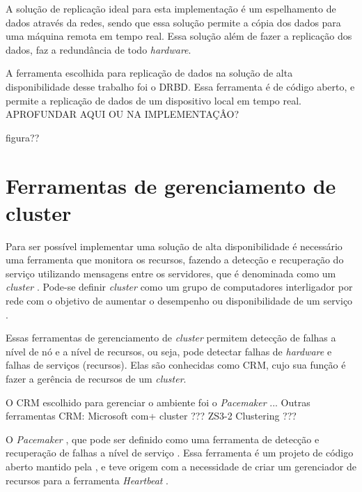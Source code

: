 A solução de replicação ideal para esta implementação é um espelhamento de dados através da redes, sendo que essa solução permite a cópia dos 
dados para uma máquina remota em tempo real. Essa solução além de fazer a replicação dos dados, faz a redundância de todo \textit{hardware}.

A ferramenta escolhida para replicação de dados na solução de alta disponibilidade desse trabalho foi o \ac{DRBD}. Essa ferramenta é de código
aberto, e permite a replicação de dados de um dispositivo local em tempo real. 
APROFUNDAR AQUI OU NA IMPLEMENTAÇÂO?

figura??


\section{Ferramentas de gerenciamento de cluster}
\label{section:toolcluster}

Para ser possível implementar uma solução de alta disponibilidade é necessário uma ferramenta que monitora os recursos, fazendo a detecção e
recuperação do serviço utilizando mensagens entre os servidores, que é denominada como um \textit{cluster} \cite{perkov2011}. 
Pode-se definir \textit{cluster} como um grupo de computadores interligador por rede com o objetivo de aumentar o desempenho ou disponibilidade
de um serviço \cite{freitas2005}.

Essas ferramentas de gerenciamento de \textit{cluster} permitem detecção de falhas a nível de nó e a nível de recursos, ou seja, pode detectar
falhas de \textit{hardware} e falhas de serviços (recursos).
Elas são conhecidas como \ac{CRM}, cujo sua função é fazer a gerência de recursos de um \textit{cluster}.

O \ac{CRM} escolhido para gerenciar o ambiente foi o \textit{Pacemaker} ...
Outras ferramentas CRM:
Microsoft com+ cluster ???
ZS3-2 Clustering ???

O \textit{Pacemaker} \cite{pacemaker}, que pode ser definido como uma ferramenta de detecção e recuperação de falhas a nível de 
serviço \cite{perkov2011}. Essa ferramenta é um projeto de código aberto mantido pela \cite{clusterlabs}, e teve origem com a necessidade de 
criar um gerenciador de recursos para a ferramenta \textit{Heartbeat} \cite{heartbeat}. 

